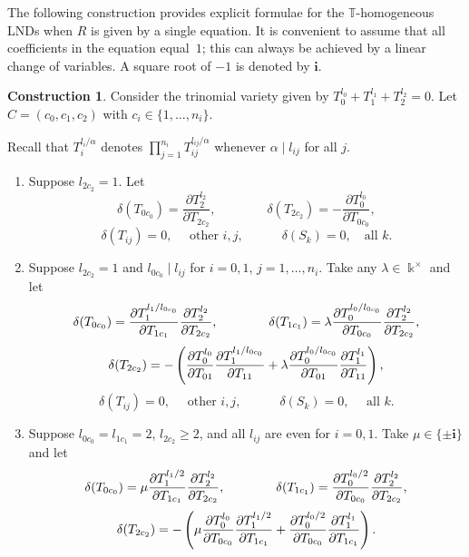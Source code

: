 \documentclass[a4paper,reqno,12pt]{amsart}
\theoremstyle{plain}
\theoremstyle{definition}
\newtheorem{construction}[theorem]{Construction}
\theoremstyle{plain}
\theoremstyle{remark}
\newcommand{\TT}{\mathbb{T}}
\newcommand{\ii}{\mathbf{i}}
\begin{document}
The following construction provides explicit formulae for the ${\TT}$-homogeneous LNDs when $R$ is given by a single equation. It is convenient to assume that all coefficients in the equation equal~$1$; this can always be achieved by a linear change of variables. A square root of $-1$ is denoted by $\ii$.
\begin{construction}\label{ConstrDer2}
    Consider the trinomial variety given by $T_0^{l_0}+T_1^{l_1} + T_{2}^{l_2}=0$. Let $C=(c_0, c_1, c_2)$ with $c_i\in\{1,\ldots,n_i\}$. 
    
   Recall that $T_i^{l_i/\alpha}$ denotes $\prod_{j=1}^{n_i} T_{ij}^{l_{ij}/\alpha}$ whenever $\alpha\mid l_{ij}$ for all $j$.
    \begin{enumerate}
        \item [$(a)$] Suppose $l_{2c_2}=1$. Let 
                $$ \delta(T_{0c_0}) = 
                 \frac {\partial T_2^{l_2}}{\partial T_{2c_2}},\qquad \qquad
                 \delta(T_{2c_2})=-\frac {\partial T_0^{l_0}}{\partial T_{0c_0}},$$
                 $$\delta(T_{ij})=0, \quad\mbox{ other $i,j$},\qquad\quad 
                 \delta(S_k) = 0,\quad \text{all } k.$$
        \item [$(b)$] Suppose $l_{2c_2}=1$ and $l_{0c_0}\mid l_{ij}$ for $i=0,1$, $j=1,\ldots,n_i$. Take any $\lambda\in\Bbbk^\times$ and let
        $$ \delta(T_{0c_0}) = 
                 \frac {\partial T_1^{l_1/l_{0c_0}}}{\partial T_{1c_1}}{\partial T_2^{l_2}\over\partial T_{2c_2}},\qquad \qquad
                 \delta(T_{1c_1})=\lambda\frac {\partial T_0^{l_0/l_{0c_0}}}{\partial T_{0c_0}}{\partial T_2^{l_2}\over\partial T_{2c_2}},$$
                 $$
                 \delta(T_{2c_2})= -\left( {\partial T_0^{l_0}\over\partial T_{01}}{\partial T_1^{l_1/l_{0c_0}}\over\partial T_{11}} +\lambda {\partial T_0^{l_0/l_{0c_0}}\over\partial T_{01}} {\partial T_1^{l_1}\over\partial T_{11}}\right),
                 $$
        $$\delta(T_{ij})=0,\quad\mbox{ other $i,j,$}\qquad\quad\delta(S_k)=0,\quad\mbox { all $k$.}$$
        \item[$(c)$] Suppose $l_{0c_0}=l_{1c_1}=2$, $l_{2c_2}\ge2$, and all $l_{ij}$ are even for $i=0,1$. Take $\mu\in\{\pm\ii\}$ and let
        $$
        \delta(T_{0c_0})=\mu {\partial T_1^{l_1/2}\over\partial T_{1c_1}}{\partial T_2^{l_2}\over\partial T_{2c_2}},\qquad\qquad         
        \delta(T_{1c_1})={\partial T_0^{l_0/2}\over\partial T_{0c_0}}{\partial T_2^{l_2}\over\partial T_{2c_2}},
        $$              
        $$
        \delta(T_{2c_2})=-\left(\mu{\partial T_0^{l_0}\over\partial T_{0c_0}}{\partial T_1^{l_1/2}\over\partial T_{1c_1}} + {\partial T_0^{l_0/2}\over\partial T_{0c_0}}{\partial T_1^{l_1}\over\partial T_{1c_1}} \right).
$$
\end{enumerate}
\end{construction}
\end{document}
